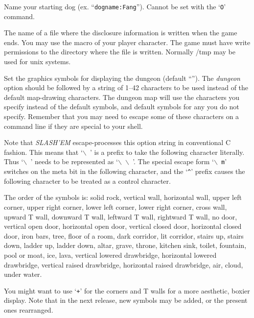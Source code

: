 \item[\ib{dogname}]
Name your starting dog (ex. ``{\tt dogname:Fang}'').
Cannot be set with the `{\tt O}' command.

\item[\ib{dumpfile}]
The name of a file where the disclosure information is written when the
game ends. You may use the macro %
of your player character. The game must have write permissions to the
directory where the file is written. Normally /tmp may be used for unix
systems.

\item[\ib{dungeon}]
Set the graphics symbols for displaying the dungeon
(default \relax{}``'').
The
{\it dungeon\/} 
option should be followed by a string of 1--42
characters to be used instead of the default map-drawing characters.
The dungeon map will use the characters you specify instead of the
default symbols, and default symbols for any you do not specify.
Remember that you may need to escape some of these characters
on a command line if they are special to your shell.

Note that {\it SLASH'EM\/} escape-processes this option string in conventional C
fashion.  This means that `{\tt $\backslash$ }' is a prefix to take the following
character literally.  Thus `{\tt $\backslash$ }' needs to be represented as `{\tt $\backslash$ $\backslash$ }'.
The special escape
form `{\tt $\backslash$ m}' switches on the meta bit in the following character, and the `{\tt \^{}}'
prefix causes the following character to be treated as a control
character.

The order of the symbols is:  solid rock, vertical wall, horizontal
wall, upper left corner, upper right corner, lower left corner, lower
right corner, cross wall, upward T wall, downward T wall, leftward T
wall, rightward T wall, no door, vertical open door, horizontal open
door, vertical closed door, horizontal closed door, iron bars, tree,
floor of a room, dark corridor, lit corridor, stairs up, stairs down,
ladder up, ladder down, altar, grave, throne, kitchen sink, toilet,
fountain, pool or moat,
ice, lava, vertical lowered drawbridge, horizontal lowered drawbridge,
vertical raised drawbridge, horizontal raised drawbridge, air, cloud,
under water.

You might want to use `{\tt +}' for the corners and T walls for a more
aesthetic, boxier display.  Note that in the next release, new symbols
may be added, or the present ones rearranged.


